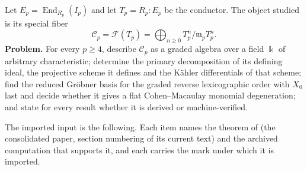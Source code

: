 \documentclass[11pt]{article}
\theoremstyle{definition}
\theoremstyle{remark}
\newcommand{\kfield}{\Bbbk}
\newcommand{\Cfiber}{\mathcal{C}}
\newcommand{\Fcone}{\mathcal{F}}
\begin{document}
Let $E_p=\operatorname{End}_{R_p}(I_p)$ and let $T_p=R_p:E_p$ be the conductor. The object
studied is its special fiber
\[
\Cfiber_p=\Fcone(T_p)=\bigoplus_{n\geq0}T_p^n/\mathfrak m_pT_p^n.
\]
\textbf{Problem.} For every $p\geq4$, describe $\Cfiber_p$ as a graded algebra over a field
$\kfield$ of arbitrary characteristic; determine the primary decomposition of its defining
ideal, the projective scheme it defines and the K\"ahler differentials of that scheme; find the
reduced Gr\"obner basis for the graded reverse lexicographic order with $X_0$ last and decide
whether it gives a flat Cohen--Macaulay monomial degeneration; and state for every result
whether it is derived or machine-verified.

The imported input is the following. Each item names the theorem of \cite{SantibanezLeal2026}
(the consolidated paper, section numbering of its current text) and the archived computation
that supports it, and each carries the mark under which it is imported.
\end{document}
